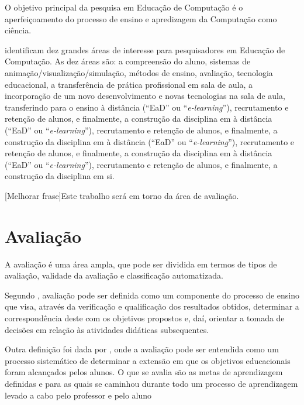 \documentclass[
	12pt,				%
	openright,			%
	oneside,
	a4paper,			%
	english,			%
	french,				%
	spanish,			%
	brazil,				%
	]{abntex2}
\begin{document}
O objetivo principal da pesquisa em Educação de Computação é o aperfeiçoamento do processo de ensino e apredizagem da Computação como ciência. \cite{holmboe2001research}

 identificam dez grandes áreas de interesse para pesquisadores em Educação de Computação. As dez áreas são: a compreensão do aluno, sistemas de animação/visualização/simulação, métodos de ensino, avaliação, tecnologia educacional, a transferência de prática profissional em sala de aula, a incorporação de um novo desenvolvimento e novas tecnologias na sala de aula, transferindo para o ensino à distância (“EaD” ou “\textit{e-learning}”), recrutamento e retenção de alunos, e finalmente, a construção da disciplina em à distância (“EaD” ou “\textit{e-learning}”), recrutamento e retenção de alunos, e finalmente, a construção da disciplina em à distância (“EaD” ou “\textit{e-learning}”), recrutamento e retenção de alunos, e finalmente, a construção da disciplina em à distância (“EaD” ou “\textit{e-learning}”), recrutamento e retenção de alunos, e finalmente, a construção da disciplina em si. 

{\color{red}[Melhorar frase]Este trabalho será em torno da área de avaliação.}


\section{Avaliação}
\label{sec:AVA}
A avaliação é uma área ampla, que pode ser dividida em termos de tipos de avaliação, validade da avaliação e classificação automatizada. \cite{fincher2005mapping}

Segundo , avaliação pode ser definida como um componente do processo de ensino que visa, através da verificação e qualificação dos resultados obtidos, determinar a correspondência  deste com os objetivos propostos e, daí, orientar a tomada de decisões em relação às atividades didáticas subsequentes.

Outra definição foi dada por , onde a avaliação pode ser entendida como um processo sistemático de determinar a extensão em que os objetivos educacionais foram alcançados pelos alunos. O que se avalia são as metas de aprendizagem definidas e para as quais se caminhou durante todo um processo de aprendizagem levado a cabo pelo professor e pelo aluno
\end{document}

